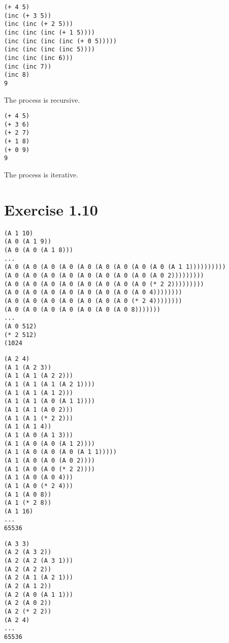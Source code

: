 \documentclass[../main.tex]{subfiles}
\begin{document}
\begin{lstlisting}
(+ 4 5)
(inc (+ 3 5))
(inc (inc (+ 2 5)))
(inc (inc (inc (+ 1 5))))
(inc (inc (inc (inc (+ 0 5)))))
(inc (inc (inc (inc 5))))
(inc (inc (inc 6)))
(inc (inc 7))
(inc 8)
9
\end{lstlisting}

The process is recursive.

\begin{lstlisting}
(+ 4 5)
(+ 3 6)
(+ 2 7)
(+ 1 8)
(+ 0 9)
9
\end{lstlisting}

The process is iterative.

\section{Exercise 1.10}

\begin{lstlisting}
(A 1 10)
(A 0 (A 1 9))
(A 0 (A 0 (A 1 8)))
...
(A 0 (A 0 (A 0 (A 0 (A 0 (A 0 (A 0 (A 0 (A 0 (A 1 1))))))))))
(A 0 (A 0 (A 0 (A 0 (A 0 (A 0 (A 0 (A 0 (A 0 2)))))))))
(A 0 (A 0 (A 0 (A 0 (A 0 (A 0 (A 0 (A 0 (* 2 2)))))))))
(A 0 (A 0 (A 0 (A 0 (A 0 (A 0 (A 0 (A 0 4))))))))
(A 0 (A 0 (A 0 (A 0 (A 0 (A 0 (A 0 (* 2 4))))))))
(A 0 (A 0 (A 0 (A 0 (A 0 (A 0 (A 0 8)))))))
...
(A 0 512)
(* 2 512)
(1024
\end{lstlisting}

\begin{lstlisting}
(A 2 4)
(A 1 (A 2 3))
(A 1 (A 1 (A 2 2)))
(A 1 (A 1 (A 1 (A 2 1))))
(A 1 (A 1 (A 1 2)))
(A 1 (A 1 (A 0 (A 1 1))))
(A 1 (A 1 (A 0 2)))
(A 1 (A 1 (* 2 2)))
(A 1 (A 1 4))
(A 1 (A 0 (A 1 3)))
(A 1 (A 0 (A 0 (A 1 2))))
(A 1 (A 0 (A 0 (A 0 (A 1 1)))))
(A 1 (A 0 (A 0 (A 0 2))))
(A 1 (A 0 (A 0 (* 2 2))))
(A 1 (A 0 (A 0 4)))
(A 1 (A 0 (* 2 4)))
(A 1 (A 0 8))
(A 1 (* 2 8))
(A 1 16)
...
65536
\end{lstlisting}

\begin{lstlisting}
(A 3 3)
(A 2 (A 3 2))
(A 2 (A 2 (A 3 1)))
(A 2 (A 2 2))
(A 2 (A 1 (A 2 1)))
(A 2 (A 1 2))
(A 2 (A 0 (A 1 1)))
(A 2 (A 0 2))
(A 2 (* 2 2))
(A 2 4)
...
65536
\end{lstlisting}
\end{document}
